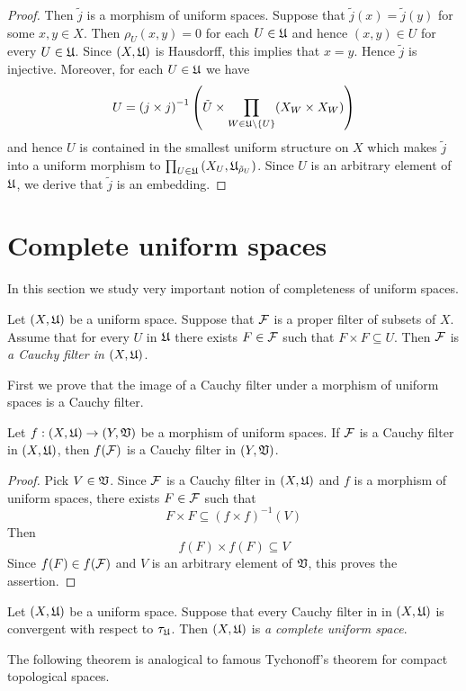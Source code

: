 \begin{proof}
Then $\tilde{j}$ is a morphism of uniform spaces. Suppose that $\tilde{j}(x) = \tilde{j}(y)$ for some $x,y\in X$. Then $\rho_U(x,y) = 0$ for each $U \in {\mathfrak U}$ and hence $(x,y) \in U$ for every $U\in {\mathfrak U}$. Since $(X,{\mathfrak U})$ is Hausdorff, this implies that $x = y$. Hence $\tilde{j}$ is injective. Moreover, for each $U \in {\mathfrak U}$ we have
$$U = \left(j\times j\right)^{-1}\left(\tilde{U}\times \prod_{W\in {\mathfrak U}\setminus \{U\}}(X_W\times X_W)\right)$$
and hence $U$ is contained in the smallest uniform structure on $X$ which makes $\tilde{j}$ into a uniform morphism to $\prod_{U\in {\mathfrak U}}\left(X_U,{\mathfrak U}_{\tilde{\rho}_U}\right)$. Since $U$ is an arbitrary element of ${\mathfrak U}$, we derive that $\tilde{j}$ is an embedding.
\end{proof}

\section{Complete uniform spaces}
\noindent
In this section we study very important notion of completeness of uniform spaces.

\begin{definition}
Let $(X,{\mathfrak U})$ be a uniform space. Suppose that ${\mathcal F}$ is a proper filter of subsets of $X$. Assume that for every $U$ in ${\mathfrak U}$ there exists $F \in {\mathcal F}$ such that $F\times F\subseteq U$. Then ${\mathcal F}$ is \textit{a Cauchy filter in $\left(X,{\mathfrak U}\right)$}.
\end{definition}
\noindent
First we prove that the image of a Cauchy filter under a morphism of uniform spaces is a Cauchy filter.

\begin{fact}\label{fact:images_of_Cauchy_filters_under_uniform_morphisms_are_Cauchy}
Let $f:\left(X,{\mathfrak U}\right)\rightarrow \left(Y,{\mathfrak V}\right)$ be a morphism of uniform spaces. If ${\mathcal F}$ is a Cauchy filter in $\left(X,{\mathfrak U}\right)$, then $f({\mathcal F})$ is a Cauchy filter in $\left(Y,{\mathfrak V}\right)$.
\end{fact}
\begin{proof}
Pick $V \in {\mathfrak V}$. Since ${\mathcal F}$ is a Cauchy filter in $\left(X,{\mathfrak U}\right)$ and $f$ is a morphism of uniform spaces, there exists $F \in {\mathcal F}$ such that $$F\times F \subseteq (f\times f)^{-1}(V)$$
Then
$$f(F)\times f(F)\subseteq V$$
Since $f(F) \in f({\mathcal F})$ and $V$ is an arbitrary element of ${\mathfrak V}$, this proves the assertion.
\end{proof}

\begin{definition}
Let $(X,{\mathfrak U})$ be a uniform space. Suppose that every Cauchy filter in in $\left(X,{\mathfrak U}\right)$ is convergent with respect to $\tau_{{\mathfrak U}}$. Then $\left(X,{\mathfrak U}\right)$ is \textit{a complete uniform space}. 
\end{definition}
\noindent
The following theorem is analogical to famous Tychonoff's theorem for compact topological spaces.


